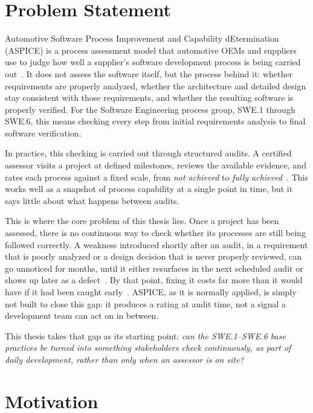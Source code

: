 \documentclass[a4paper, 12pt, oneside, openany, BCOR1cm,toc=chapterentrywithdots]{scrbook}
\begin{document}
\section{Problem Statement}

Automotive Software Process Improvement and Capability dEtermination (ASPICE) is a process
assessment model that automotive OEMs and suppliers use to judge how well a supplier's software
development process is being carried out~\cite{vdaqmc2023pam}. It does not assess the software
itself, but the process behind it: whether requirements are properly analyzed, whether the
architecture and detailed design stay consistent with those requirements, and whether the
resulting software is properly verified. For the Software Engineering process group,
SWE.1 through SWE.6, this means checking every step from initial requirements analysis to final
software verification.

In practice, this checking is carried out through structured audits. A certified assessor visits
a project at defined milestones, reviews the available evidence, and rates each process against
a fixed scale, from \emph{not achieved} to \emph{fully achieved}~\cite{vdaqmc2023pam,murphy_aspice_0to60}.
This works well as a snapshot of process capability at a single point in time, but it says little
about what happens between audits.

This is where the core problem of this thesis lies. Once a project has been assessed, there is no
continuous way to check whether its processes are still being followed correctly. A weakness
introduced shortly after an audit, in a requirement that is poorly analyzed or a design decision
that is never properly reviewed, can go unnoticed for months, until it either resurfaces in the
next scheduled audit or shows up later as a defect~\cite{datsogiannis2024early}. By that point,
fixing it costs far more than it would have if it had been caught
early~\cite{schauffele2016automotive,jiang2013earlylifecycle}. ASPICE, as it is normally applied,
is simply not built to close this gap: it produces a rating at audit time, not a signal a
development team can act on in between.

This thesis takes that gap as its starting point: \emph{can the SWE.1--SWE.6 base practices be
turned into something stakeholders check continuously, as part of daily development, rather than
only when an assessor is on site?}

\section{Motivation}
\end{document}
